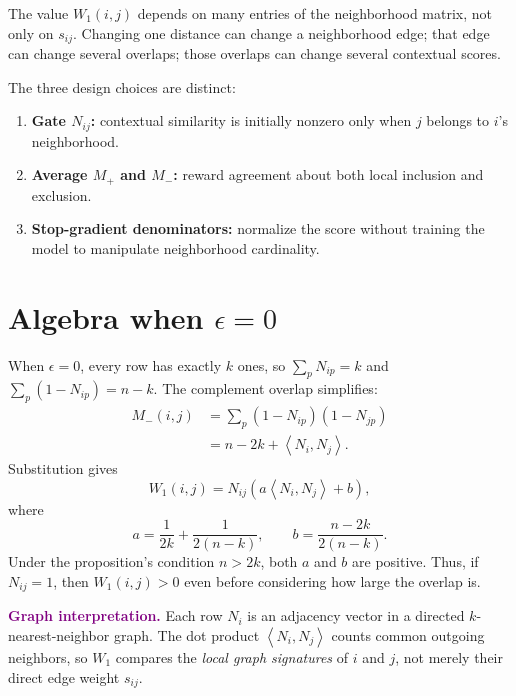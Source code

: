 \documentclass[11pt,oneside,openany]{book}
\theoremstyle{myplain}
\theoremstyle{definition}
\newcommand{\inner}[2]{\left\langle #1,#2\right\rangle}
\newcommand{\paperEq}[1]{\tag{P#1}}
\begin{document}
\begin{conceptbox}[title=Why this is more than pairwise similarity]
The value $W_1(i,j)$ depends on many entries of the neighborhood matrix, not only on $s_{ij}$. Changing one distance can change a neighborhood edge; that edge can change several overlaps; those overlaps can change several contextual scores.
\end{conceptbox}


The three design choices are distinct:
\begin{enumerate}[leftmargin=*,itemsep=3pt]
  \item \textbf{Gate $N_{ij}$:} contextual similarity is initially nonzero only when $j$ belongs to $i$'s neighborhood.
  \item \textbf{Average $M_+$ and $M_-$:} reward agreement about both local inclusion and exclusion.
  \item \textbf{Stop-gradient denominators:} normalize the score without training the model to manipulate neighborhood cardinality.
\end{enumerate}

\section{Algebra when $\epsilon=0$}

When $\epsilon=0$, every row has exactly $k$ ones, so $\sum_pN_{ip}=k$ and $\sum_p(1-N_{ip})=n-k$. The complement overlap simplifies:
\begin{align*}
M_-(i,j)
&=\sum_p(1-N_{ip})(1-N_{jp})\\
&=n-2k+\inner{N_i}{N_j}.
\paperEq{12}
\label{eq:mminus-simplify}
\end{align*}
Substitution gives
\begin{equation*}
W_1(i,j)=N_{ij}\left(a\inner{N_i}{N_j}+b\right),
\paperEq{14}
\label{eq:w1-simplified}
\end{equation*}
where
\begin{equation}
  a=\frac{1}{2k}+\frac{1}{2(n-k)},\qquad
  b=\frac{n-2k}{2(n-k)}.
  \label{eq:ab}
\end{equation}
Under the proposition's condition $n>2k$, both $a$ and $b$ are positive. Thus, if $N_{ij}=1$, then $W_1(i,j)>0$ even before considering how large the overlap is.

\medskip
\noindent\textbf{\textcolor{purple}{Graph interpretation.}}
Each row $N_i$ is an adjacency vector in a directed $k$-nearest-neighbor graph. The dot product $\inner{N_i}{N_j}$ counts common outgoing neighbors, so $W_1$ compares the \emph{local graph signatures} of $i$ and $j$, not merely their direct edge weight $s_{ij}$.
\end{document}
